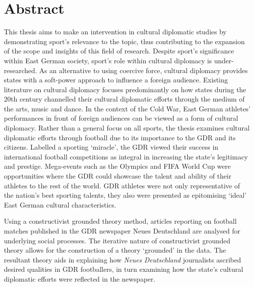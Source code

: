 

\chapter*{Abstract}

This thesis aims to make an intervention in cultural diplomatic studies by demonstrating sport’s relevance to the topic, thus contributing to the expansion of the scope and insights of this field of research. Despite sport’s significance within East German society, sport’s role within cultural diplomacy is under-researched. As an alternative to using coercive force, cultural diplomacy provides states with a soft-power approach to influence a foreign audience. Existing literature on cultural diplomacy focuses predominantly on how states during the 20th century channelled their cultural diplomatic efforts through the medium of the arts, music and dance. In the context of the Cold War, East German athletes’ performances in front of foreign audiences can be viewed as a form of cultural diplomacy. Rather than a general focus on all sports, the thesis examines cultural diplomatic efforts through football due to its importance to the GDR and its citizens. Labelled a sporting ‘miracle’, the GDR viewed their success in international football competitions as integral in increasing the state’s legitimacy and prestige. Mega-events such as the Olympics and FIFA World Cup were opportunities where the GDR could showcase the talent and ability of their athletes to the rest of the world. GDR athletes were not only representative of the nation’s best sporting talents, they also were presented as epitomising ‘ideal’ East German cultural characteristics. 

Using a constructivist grounded theory method, articles reporting on football matches published in the GDR newspaper Neues Deutschland are analysed for underlying social processes. The iterative nature of constructivist grounded theory allows for the construction of a theory ‘grounded’ in the data. The resultant theory aids in explaining how \textit{Neues Deutschland} journalists ascribed desired qualities in GDR footballers, in turn examining how the state’s cultural diplomatic efforts were reflected in the newspaper.

